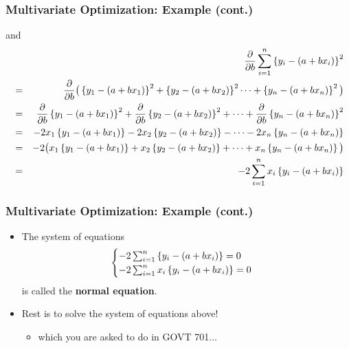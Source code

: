\documentclass[pdflatex, 12pt]{beamer}
\begin{document}
\begin{frame}
\frametitle{Multivariate Optimization: Example (cont.)}
and
{\footnotesize
\begin{eqnarray}
&& \frac{\partial}{\partial b} \sum_{i = 1}^{n} \left\{y_i - (a + bx_i)\right\}^2 \notag \\
&=& \frac{\partial}{\partial b} \big(\left\{y_1 - (a + bx_1)\right\}^2 + \left\{y_2 - (a + bx_2)\right\}^2 \cdots + \left\{y_n - (a + bx_n)\right\}^2 \big) \notag \\
&=& \frac{\partial}{\partial b} \left\{y_1 - (a + bx_1)\right\}^2 + \frac{\partial}{\partial b} \left\{y_2 - (a + bx_2)\right\}^2 + \cdots + \frac{\partial}{\partial b} \left\{y_n - (a + bx_n)\right\}^2 \notag \\
&=& -2x_1\left\{y_1 - (a + bx_1)\right\} - 2x_2\left\{y_2 - (a + bx_2)\right\} - \cdots - 2x_n\left\{y_n - (a + bx_n)\right\} \notag \\
&=& -2\big(x_1\left\{y_1 - (a + bx_1)\right\} + x_2\left\{y_2 - (a + bx_2)\right\} + \cdots + x_n\left\{y_n - (a + bx_n)\right\}\big) \notag \\
&=& -2 \sum_{i = 1}^{n} x_i\left\{y_i - (a + bx_i)\right\} \notag
\end{eqnarray}
}
\end{frame}

\begin{frame}
\frametitle{Multivariate Optimization: Example (cont.)}
\begin{itemize}
\item The system of equations
 \begin{eqnarray}
 \begin{cases}
 -2 \sum_{i = 1}^{n} \left\{y_i - (a + bx_i)\right\} = 0 \\
 -2 \sum_{i = 1}^{n} x_i\left\{y_i - (a + bx_i)\right\} = 0 \notag
 \end{cases}
 \end{eqnarray}
is called the \textbf{normal equation}. 
\vspace{0.4cm}
\item Rest is to solve the system of equations above!
 \begin{itemize}
 \item which you are asked to do in GOVT 701...
 \end{itemize}
\end{itemize}
\end{frame}
\end{document}
